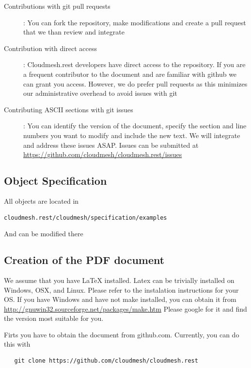 \documentclass[10pt]{article}
\begin{document}
\begin{description}
\item[Contributions with git pull requests]: You can fork the
  repository, make modifications and create a pull request that we
  than review and integrate
\item[Contribution with direct access]: Cloudmesh.rest developers have
  direct access to the repository. If you are a frequent contributor
  to the document and are familiar with github we can grant you
  access. However, we do prefer pull requests as this minimizes our
  administrative overhead to avoid issues with git
\item[Contributing ASCII sections with git issues]: You can identify
  the version of the document, specify the section and line numbers
  you want to modify and include the new text. We will integrate and
  address these issues ASAP. Issues can be submitted at 
  \url{https://github.com/cloudmesh/cloudmesh.rest/issues}
\end{description}


\subsection{Object Specification}

All objects are located in 

\begin{verbatim}
cloudmesh.rest/cloudmesh/specification/examples
\end{verbatim}

And can be modified there

\subsection{Creation of the PDF document}

We assume that you have LaTeX installed. Latex can be trivially
installed on Windows, OSX, and Linux. Please refer to the instalation
instructions for your OS. If you have Windows and have not make installed, you can
obtain it from \url{http://gnuwin32.sourceforge.net/packages/make.htm}
Please google for it and find the version most suitable for you.

Firts you have to obtain the document from github.com. Currently, you
can do this with 

\begin{verbatim}
   git clone https://github.com/cloudmesh/cloudmesh.rest
\end{verbatim}
\end{document}
